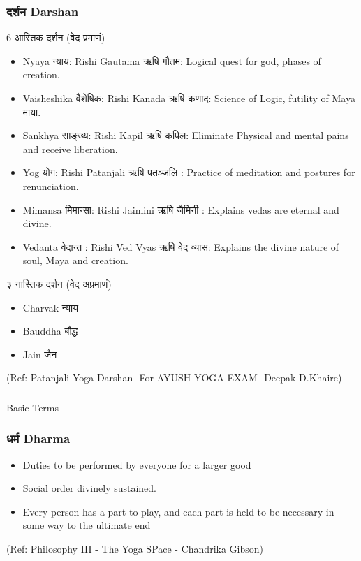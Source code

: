 \begin{frame}[fragile]\frametitle{दर्शन Darshan}

6 आस्तिक दर्शन (वेद प्रमाणं)
	\begin{itemize}
	\item Nyaya न्याय: Rishi Gautama ऋषि गौतम: Logical quest for god, phases of creation.
	\item Vaisheshika वैशेषिक: Rishi Kanada ऋषि कणाद: Science of Logic, futility of Maya माया.
	\item Sankhya साङ्ख्य: Rishi Kapil ऋषि कपिल: Eliminate Physical and mental pains and receive liberation.
	\item Yog योग: Rishi Patanjali ऋषि पतञ्जलि : Practice of meditation and postures for renunciation.
	\item Mimansa मिमान्सा: Rishi Jaimini ऋषि जैमिनी : Explains vedas are eternal and divine.
	\item Vedanta वेदान्त : Rishi Ved Vyas ऋषि वेद व्यास: Explains the divine nature of soul, Maya and creation.	
	\end{itemize}

३ नास्तिक दर्शन (वेद अप्रमाणं)

	\begin{itemize}
	\item Charvak न्याय
	\item Bauddha बौद्ध
	\item Jain जैन

	\end{itemize}
  \tiny{(Ref: Patanjali Yoga Darshan- For AYUSH YOGA EXAM- Deepak D.Khaire)}

\end{frame}
	

\begin{frame}[fragile]\frametitle{}
\begin{center}
{\Large Basic Terms}
\end{center}
\end{frame}

\begin{frame}[fragile]\frametitle{ धर्म Dharma}

	\begin{itemize}
	\item Duties to be performed by everyone for a larger good
	\item Social order divinely sustained.
	\item Every person has a part to play, and each part is held to be necessary in some way to the ultimate end

	\end{itemize}

\tiny{(Ref: Philosophy III - The Yoga SPace - Chandrika Gibson)}

\end{frame}

